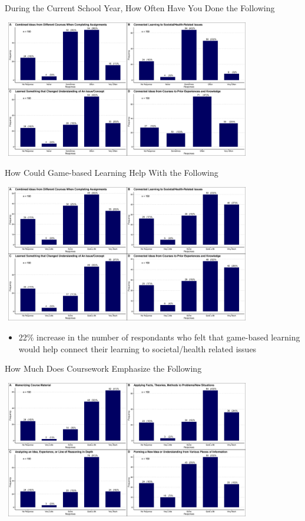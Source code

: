 \documentclass{beamer}
\begin{document}
	\begin{frame}{During the Current School Year, How Often Have You Done the Following}
		\begin{center}
			\includegraphics[width=11cm, height=6cm]{how_often_haveyou_done_thefollowing.jpg}
		\end{center}
	\end{frame}

	\begin{frame}{How Could Game-based Learning Help With the Following}
		\begin{center}
			\includegraphics[width=11cm, height=6cm]{how_does_gbl_help_in_science.jpg}
			\begin{itemize}
				\item 22\% increase in the number of respondants who felt that game-based learning would help connect their learning to societal/health related issues
			\end{itemize}
		\end{center}
	\end{frame}

	\begin{frame}{How Much Does Coursework Emphasize the Following}
		\begin{center}
			\includegraphics[width=11cm, height=6cm]{howmuch_coursework_emphasized_thefollowing.jpg}
		\end{center}
	\end{frame}
\end{document}
